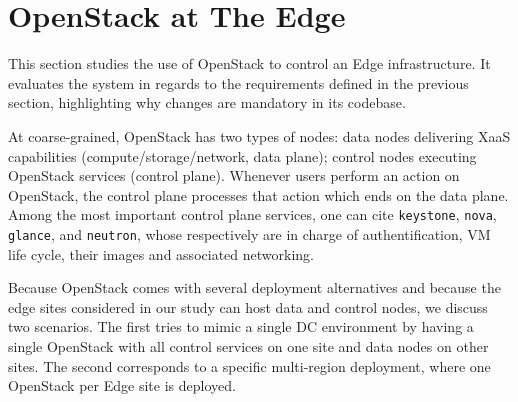 \section{OpenStack at The Edge}
\label{sec:system_design_considerations}
%
This section studies the use of OpenStack to control an Edge
infrastructure.  It evaluates the system in regards to the
requirements defined in the previous section, highlighting why changes
are mandatory in its codebase.

%

At coarse-grained, OpenStack has two types of nodes: data nodes delivering XaaS capabilities (compute/storage/network, \ie data plane); control nodes executing OpenStack services (\ie control plane). Whenever users perform an action on OpenStack, the control
plane processes that action which ends on the data plane.
Among the most important control plane services, one can cite
\verb|keystone|, \verb|nova|, \verb|glance|, and \verb|neutron|, whose respectively are in charge of
authentification, VM life cycle, their images and associated networking.

Because OpenStack comes with several deployment alternatives and
because the edge sites considered in our study can host
data and control nodes, we discuss two scenarios. The first tries to mimic a single DC  environment by having a single OpenStack with all control services on one site 
and data nodes on other sites.
The second
corresponds to a specific multi-region deployment, where one OpenStack
per Edge site is deployed.

